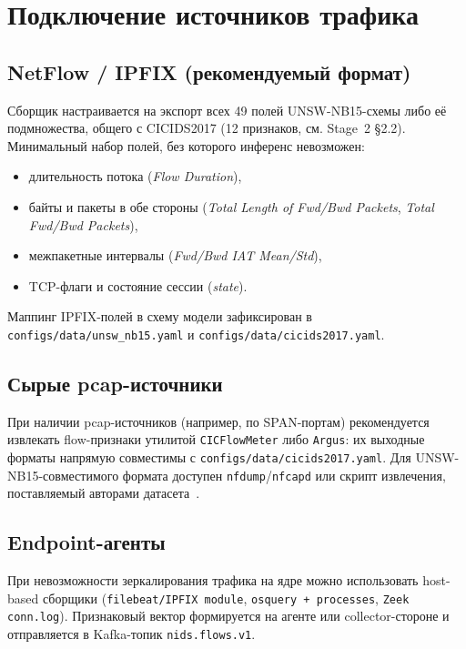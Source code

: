 \documentclass[14pt, a4paper]{extarticle}
\begin{document}
\section{Подключение источников трафика}

\subsection{NetFlow / IPFIX (рекомендуемый формат)}

Сборщик настраивается на экспорт всех 49 полей UNSW-NB15-схемы либо
её подмножества, общего с CICIDS2017 (12 признаков, см. Stage~2
§2.2). Минимальный набор полей, без которого инференс невозможен:

\begin{itemize}
    \item длительность потока (\emph{Flow Duration}),
    \item байты и пакеты в обе стороны
    (\emph{Total Length of Fwd/Bwd Packets}, \emph{Total Fwd/Bwd Packets}),
    \item межпакетные интервалы (\emph{Fwd/Bwd IAT Mean/Std}),
    \item TCP-флаги и состояние сессии (\emph{state}).
\end{itemize}

Маппинг IPFIX-полей в схему модели зафиксирован в
\verb|configs/data/unsw_nb15.yaml| и \verb|configs/data/cicids2017.yaml|.

\subsection{Сырые pcap-источники}

При наличии pcap-источников (например, по SPAN-портам) рекомендуется
извлекать flow-признаки утилитой \texttt{CICFlowMeter} либо
\texttt{Argus}: их выходные форматы напрямую совместимы с
\verb|configs/data/cicids2017.yaml|. Для UNSW-NB15-совместимого формата
доступен \texttt{nfdump}/\texttt{nfcapd} или скрипт извлечения,
поставляемый авторами датасета~\cite{moustafa2015unsw}.

\subsection{Endpoint-агенты}

При невозможности зеркалирования трафика на ядре можно использовать
host-based сборщики (\texttt{filebeat/IPFIX module},
\texttt{osquery + processes}, \texttt{Zeek conn.log}). Признаковый
вектор формируется на агенте или collector-стороне и отправляется в
Kafka-топик \texttt{nids.flows.v1}.
\end{document}
